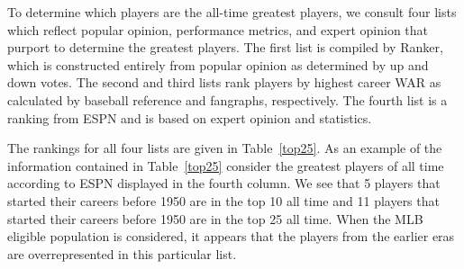 \documentclass[11pt]{article}\usepackage[]{graphicx}\usepackage[]{color}
\begin{document}
To determine which players are the all-time greatest players, we consult four 
lists which reflect popular opinion, performance metrics, and expert opinion 
that purport to determine the greatest players.  The first 
list is compiled by Ranker, %
which is constructed entirely from popular opinion as determined by up and 
down votes.  
The second and third lists rank players by highest career WAR as calculated 
by baseball reference and fangraphs, respectively. 
The fourth list is a ranking from ESPN %
and is based on expert opinion and statistics. %

The rankings for all four lists are given in Table~\ref{top25}.  
As an example of the information contained in Table~\ref{top25} consider 
the greatest players of all time according to ESPN  
displayed in the fourth column.  
We see that 5 players that started their careers before 1950 are in the top 10 
all time and 11 players that started their careers before 1950 are in the top 
25 all time.  When the MLB eligible population is considered, it appears that 
the players from the earlier eras are overrepresented in this particular list.  
\end{document}
